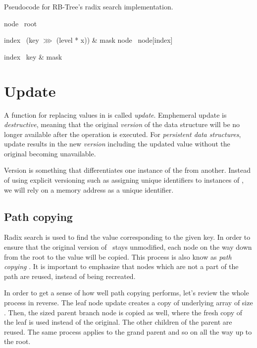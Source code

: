 \begin{listing}[ht!]        
    \caption{Pseudocode for RB-Tree's radix search implementation.}
    \label{lst:rb-tree-radix-search}

    \begin{algorithmic}
            \State node \la\ root

                \State index \la\ (key $\ggg$ (level * x)) \& mask
                \State node \la\ node[index]
            \EndFor

            \State index \la\ key \& mask
            \State {}
        \EndFunction
    \end{algorithmic}
\end{listing}

\section{Update}
A function for replacing values in \rbtree{} is called \emph{update}. Emphemeral update is \emph{destructive}, meaning that the original \emph{version} of the data structure will be no longer available after the operation is executed. For \emph{persistent data structures}, update results in the new \emph{version} including the updated value without the original becoming unavailable. 

Version is something that differentiates one instance of the \rbtree{} from another. Instead of using explicit versioning such as assigning unique identifiers to instances of \rbtree{}, we will rely on a memory address as a unique identifier. 

\subsection*{Path copying}
Radix search is used to find the value corresponding to the given key. In order to ensure that the original version of \rbtree\ stays unmodified, each node on the way down from the root to the value will be copied. This process is also know as \emph{path copying} \cite{planar-point-location}. It is important to emphasize that nodes which are not a part of the path are reused, instead of being recreated. 

In order to get a sense of how well path copying performs, let’s review the whole process in reverse. The leaf node update creates a copy of underlying array of size \m{}. Then, the \m{} sized parent branch node is copied as well, where the fresh copy of the leaf is used instead of the original. The other children of the parent are reused. The same process applies to the grand parent and so on all the way up to the root.  

